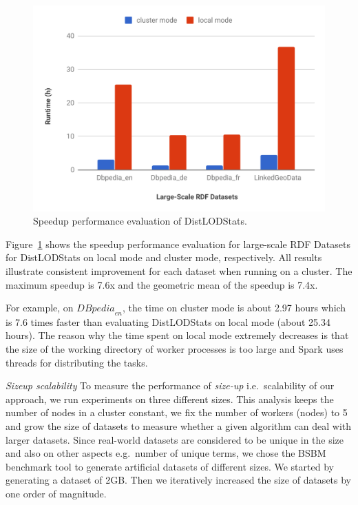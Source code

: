 \begin{figure}
  \includegraphics[width=1.0\columnwidth]{images/4_distlodstats/distlodstats-speedup-performance.pdf}
    \caption{Speedup performance evaluation of DistLODStats.}
    \label{fig:Speedup}
\end{figure}

Figure~\ref{fig:Speedup} shows the speedup performance evaluation for large-scale RDF Datasets for DistLODStats on local mode and cluster mode, respectively.
All results illustrate consistent improvement for each dataset when running on a cluster. 
The maximum speedup is 7.6x and the geometric mean of the speedup is 7.4x.

For example, on ${DBpedia}_{en}$, the time on cluster mode is about 2.97 hours which is 7.6 times faster than evaluating DistLODStats on local mode (about 25.34 hours). 
The reason why the time spent on local mode extremely decreases is that the size of the working directory of worker processes is too large and Spark uses threads for distributing the tasks.

\textit{Sizeup scalability} 
To measure the performance of \textit{size-up} i.e.~scalability of our approach, we run experiments on three different sizes.
This analysis keeps the number of nodes in a cluster constant, we fix the number of workers (nodes) to 5 and grow the size of datasets to measure whether a given algorithm can deal with larger datasets.
Since real-world datasets are considered to be unique in the size and also on other aspects e.g.~number of unique terms, we chose the BSBM benchmark tool to generate artificial datasets of different sizes.
%
We started by generating a dataset of 2GB.
Then we iteratively increased the size of datasets by one order of magnitude.

